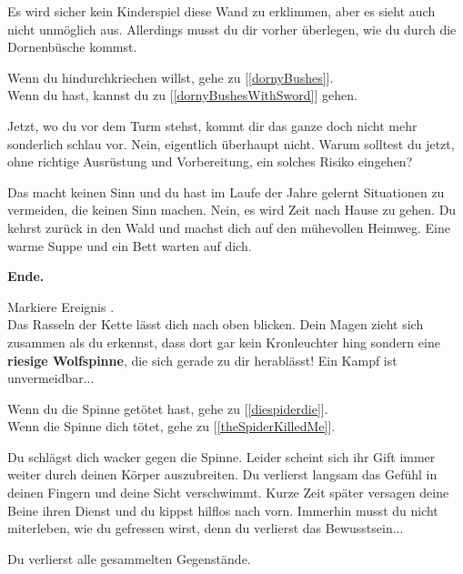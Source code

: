
Es wird sicher kein Kinderspiel diese Wand zu erklimmen, aber es sieht auch nicht unmöglich aus. Allerdings musst du dir vorher überlegen, wie du durch die Dornenbüsche kommst.

Wenn du hindurchkriechen willst, gehe zu [\ref{dornyBushes}].
\\Wenn du  hast, kannst du zu [\ref{dornyBushesWithSword}] gehen.


Jetzt, wo du vor dem Turm stehst, kommt dir das ganze doch nicht mehr sonderlich schlau vor. Nein, eigentlich überhaupt nicht. Warum solltest du jetzt, ohne richtige Ausrüstung und Vorbereitung, ein solches Risiko eingehen?

Das macht keinen Sinn und du hast im Laufe der Jahre gelernt Situationen zu vermeiden, die keinen Sinn machen. Nein, es wird Zeit nach Hause zu gehen. Du kehrst zurück in den Wald und machst dich auf den mühevollen Heimweg. Eine warme Suppe und ein Bett warten auf dich.

\textbf{Ende.}


Markiere Ereignis . \\Das Rasseln der Kette lässt dich nach oben blicken. Dein Magen zieht sich zusammen als du erkennst, dass dort gar kein Kronleuchter hing sondern eine \textbf{riesige Wolfspinne}, die sich gerade zu dir herablässt! Ein Kampf ist unvermeidbar...


Wenn du die Spinne getötet hast, gehe zu [\ref{diespiderdie}].
\\Wenn die Spinne dich tötet, gehe zu [\ref{theSpiderKilledMe}].


Du schlägst dich wacker gegen die Spinne. Leider scheint sich ihr Gift immer weiter durch deinen Körper auszubreiten. Du verlierst langsam das Gefühl in deinen Fingern und deine Sicht verschwimmt.
Kurze Zeit später versagen deine Beine ihren Dienst und du kippst hilflos nach vorn. Immerhin musst du nicht miterleben, wie du gefressen wirst, denn du verlierst das Bewusstsein...

Du verlierst alle gesammelten Gegenstände.

